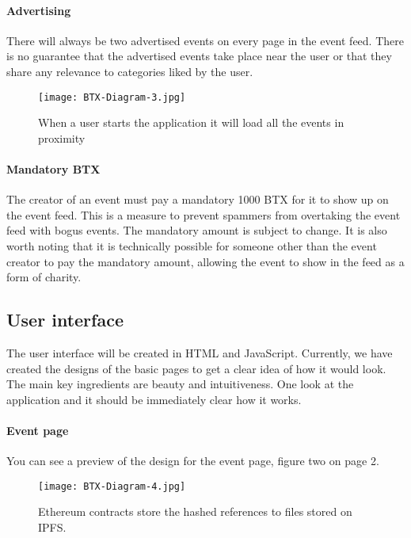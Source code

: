 \documentclass[a4paper]{article}
\begin{document}
\paragraph{Advertising} There will always be two advertised events on every page in the event feed. There is no guarantee that the advertised events take place near the user or that they share any relevance to categories liked by the user.

\begin{figure}
\centering
\texttt{[image: BTX-Diagram-3.jpg]}
\caption{\label{fig:BTX-Diagram-3}When a user starts the application it will load all the events in proximity}
\end{figure}

\paragraph{Mandatory BTX} The creator of an event must pay a mandatory 1000 BTX for it to show up on the event feed. This is a measure to prevent spammers from overtaking the event feed with bogus events. The mandatory amount is subject to change. It is also worth noting that it is technically possible for someone other than the event creator to pay the mandatory amount, allowing the event to show in the feed as a form of charity.


\subsection{User interface}
The user interface will be created in HTML and JavaScript. Currently, we have created the designs of the basic pages to get a clear idea of how it would look. The main key ingredients are beauty and intuitiveness. One look at the application and it should be immediately clear how it works. 

\paragraph{Event page} You can see a preview of the design for the event page, figure two on page 2.


\begin{figure}
\centering
\texttt{[image: BTX-Diagram-4.jpg]}
\caption{\label{fig:BTX-Diagram-4}Ethereum contracts store the hashed references to files stored on IPFS.}
\end{figure}
\end{document}
